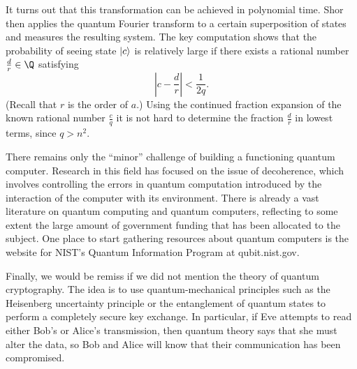 \documentclass{article}
\begin{document}
It turns out that this transformation can be achieved in polynomial time. Shor then applies the quantum Fourier transform to a certain superposition of states and measures the resulting system. The key computation shows that the probability of seeing state \(\ket{c}\) is relatively large if there exists a rational number \(\frac{d}{r} \in \Q\) satisfying 
\[
    \left| c - \frac{d}{r} \right| < \frac{1}{2q}.
\]
(Recall that \(r\) is the order of \(a\).) Using the continued fraction expansion of the known rational number \(\frac{c}{q}\) it is not hard to determine the fraction \(\frac{d}{r}\) in lowest terms, since \(q > n^{2}\).

There remains only the “minor” challenge of building a functioning quantum  computer. Research in this field has focused on the issue of decoherence,  which involves controlling the errors in quantum computation introduced by  the interaction of the computer with its environment. There is already a vast  literature on quantum computing and quantum computers, reflecting to some  extent the large amount of government funding that has been allocated to the  subject. One place to start gathering resources about quantum computers is  the website for NIST's Quantum Information Program at qubit.nist.gov. 

Finally, we would be remiss if we did not mention the theory of quantum  cryptography. The idea is to use quantum-mechanical principles such as the  Heisenberg uncertainty principle or the entanglement of quantum states to  perform a completely secure key exchange. In particular, if Eve attempts to  read either Bob's or Alice's transmission, then quantum theory says that she  must alter the data, so Bob and Alice will know that their communication  has been compromised.   
\end{document}
